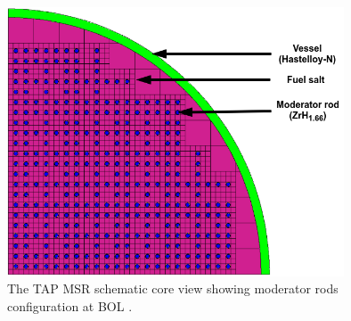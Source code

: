 \begin{frame}
\begin{textblock*}{12.7cm}
\begin{columns}
		\column[t]{6.5cm}
		\hspace{-9mm}
		\begin{figure}      
			\includegraphics[height=0.79\textwidth]{../dissertation/figures/ch4/tap_core_ornl.png}
			\caption{The \gls{TAP} \gls{MSR} schematic core view showing 
				moderator rods configuration at \gls{BOL} 
				\cite{betzler_assessment_2017-1}.}
		\end{figure}
	\end{columns}
	
\end{textblock*}

\end{frame}

